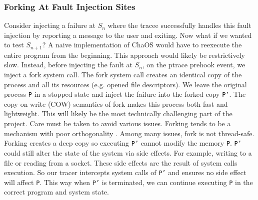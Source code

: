 \subsubsection{Forking At Fault Injection Sites}
Consider injecting a failure at $S_n$ where the tracee successfully handles this fault injection by reporting a message to the user and exiting. Now what if we wanted to test $S_{n+1}$? A naive implementation of ChaOS would have to reexecute the entire program from the beginning. This approach would likely be restrictively slow.
Instead, before injecting the fault at $S_n$, on the ptrace prehook event, we inject a fork system call. The fork system call creates an identical copy of the process and all its resources (e.g. opened file descriptors). We leave the original process \texttt{P} in a stopped state and inject the failure into the forked copy \texttt{P'}. The copy-on-write (COW) semantics of fork makes this process both fast and lightweight. This will likely be the most technically challenging part of the project. Care must be taken to avoid various issues. Forking tends to be a mechanism with poor orthogonality \cite{aforkintheroad}. Among many issues, fork is not thread-safe. Forking creates a deep copy so executing \texttt{P'} cannot modify the memory \texttt{P}. \texttt{P'} could still alter the state of the system via side effects. For example, writing to a file or reading from a socket. These side effects are the result of system calls execution. So our tracer intercepts system calls of \texttt{P'} and ensures no side effect will affect \texttt{P}. This way when \texttt{P'} is terminated, we can continue executing \texttt{P} in the correct program and system state.

